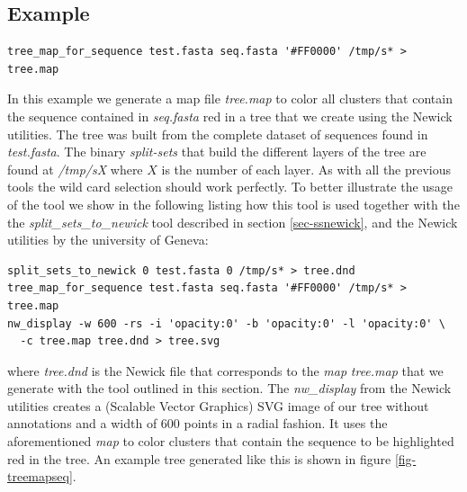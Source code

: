 \subsection{Example}
\begin{lstlisting}
tree_map_for_sequence test.fasta seq.fasta '#FF0000' /tmp/s* > tree.map
\end{lstlisting}
In this example we generate a map file \emph{tree.map} to color all
clusters that contain the sequence contained in \emph{seq.fasta} red in a
tree that we create using the Newick utilities. The tree was built from
the complete dataset of sequences found in \emph{test.fasta}. The
binary \emph{split-sets} that build the different layers of the tree
are found at \emph{/tmp/sX} where $X$ is the number of each layer. As
with all the previous tools the wild card selection should work
perfectly. To better illustrate the usage of the tool we show in the
following listing how this tool is used together with the the
\emph{split\_sets\_to\_newick} tool
described in section \ref{sec-ssnewick}, and the Newick utilities
\cite{newick_tools} by the university of Geneva:
\begin{lstlisting}
split_sets_to_newick 0 test.fasta 0 /tmp/s* > tree.dnd
tree_map_for_sequence test.fasta seq.fasta '#FF0000' /tmp/s* > tree.map
nw_display -w 600 -rs -i 'opacity:0' -b 'opacity:0' -l 'opacity:0' \
  -c tree.map tree.dnd > tree.svg
\end{lstlisting}
where \emph{tree.dnd} is the Newick file that corresponds to the \emph{map}
\emph{tree.map} that we generate with the tool outlined in this
section. The \emph{nw\_display} from the Newick utilities
\cite{newick_tools} creates a (Scalable Vector Graphics) SVG
image of our tree without annotations and a
width of 600 points in a radial fashion. It uses the aforementioned \emph{map}
to color clusters that contain the sequence to be highlighted red in the tree.
An example tree generated like this is shown in figure \ref{fig-treemapseq}.

